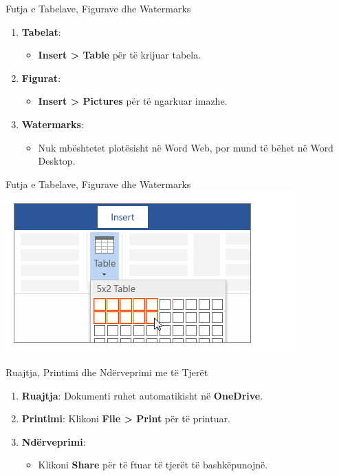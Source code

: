 \documentclass[
  ignorenonframetext,
]{beamer}
\providecommand{\tightlist}{%
  \setlength{\itemsep}{0pt}\setlength{\parskip}{0pt}}
\begin{document}
\begin{frame}{Futja e Tabelave, Figurave dhe Watermarks}
\label{futja-e-tabelave-figurave-dhe-watermarks}
\begin{enumerate}
\item
  \textbf{Tabelat}:

  \begin{itemize}
  \tightlist
  \item
    \textbf{Insert \textgreater{} Table} për të krijuar tabela.
  \end{itemize}
\item
  \textbf{Figurat}:

  \begin{itemize}
  \tightlist
  \item
    \textbf{Insert \textgreater{} Pictures} për të ngarkuar imazhe.
  \end{itemize}
\item
  \textbf{Watermarks}:

  \begin{itemize}
  \tightlist
  \item
    Nuk mbështetet plotësisht në Word Web, por mund të bëhet në Word
    Desktop.
  \end{itemize}
\end{enumerate}
\end{frame}

\begin{frame}{Futja e Tabelave, Figurave dhe Watermarks}
\label{futja-e-tabelave-figurave-dhe-watermarks-1}
\includegraphics{./images/word24.png}
\end{frame}

\begin{frame}{Ruajtja, Printimi dhe Ndërveprimi me të Tjerët}
\label{ruajtja-printimi-dhe-nduxebrveprimi-me-tuxeb-tjeruxebt}
\begin{enumerate}
\item
  \textbf{Ruajtja}: Dokumenti ruhet automatikisht në \textbf{OneDrive}.
\item
  \textbf{Printimi}: Klikoni \textbf{File \textgreater{} Print} për të
  printuar.
\item
  \textbf{Ndërveprimi}:

  \begin{itemize}
  \tightlist
  \item
    Klikoni \textbf{Share} për të ftuar të tjerët të bashkëpunojnë.
  \end{itemize}
\end{enumerate}
\end{frame}
\end{document}
